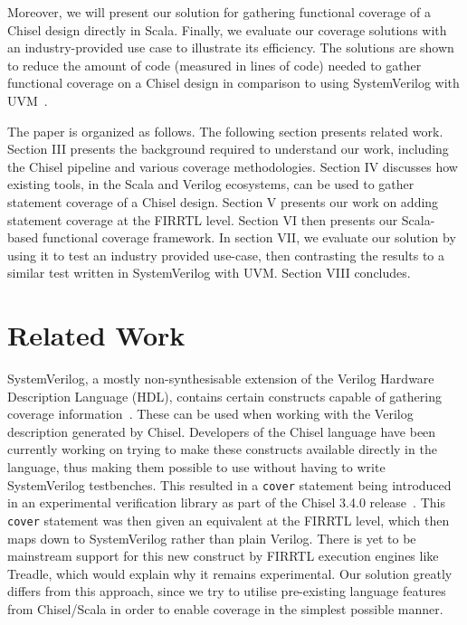\documentclass[conference]{IEEEtran}
\newcommand{\martin}[1]{{\color{blue} Martin: #1}}
\begin{document}
Moreover, we will present our solution for gathering functional coverage of a Chisel design directly in Scala. %
Finally, we evaluate our coverage solutions with an industry-provided use case to illustrate its efficiency. The solutions are shown to reduce the amount of code (measured in lines of code) needed to gather functional coverage on a Chisel design in comparison to using SystemVerilog with UVM~\cite{uvm2015}.

The paper is organized as follows.
The following section presents related work.
Section III presents the background required to understand our work, including the Chisel pipeline and various coverage methodologies. 
Section IV discusses how existing tools, in the Scala and Verilog ecosystems, can be used to gather statement coverage of a Chisel design.  
Section V presents our work on adding statement coverage at the FIRRTL level. 
Section VI then presents our Scala-based functional coverage framework.  
In section VII, we evaluate our solution by using it to test an industry provided use-case, then contrasting the results to a similar test written in SystemVerilog with UVM. 
Section VIII concludes.

\section{Related Work}


SystemVerilog, a mostly non-synthesisable extension of the Verilog Hardware Description Language (HDL), contains certain constructs capable of gathering coverage information~\cite{spear2008systemverilog}. These can be used when working with the Verilog description generated by Chisel. Developers of the Chisel language have been currently working on trying to make these constructs available directly in the language, thus making them possible to use without having to write SystemVerilog testbenches. This resulted in a \texttt{cover} statement being introduced in an experimental verification library as part of the Chisel 3.4.0 release~\cite{chisel3.4release_notes}. This \texttt{cover} statement was then given an equivalent at the FIRRTL level, which then maps down to SystemVerilog rather than plain Verilog. There is yet to be mainstream support for this new construct by FIRRTL execution engines like Treadle, which would explain why it remains experimental. Our solution greatly differs from this approach, since we try to utilise pre-existing language features from Chisel/Scala in order to enable coverage in the simplest possible manner.   
  
\end{document}
